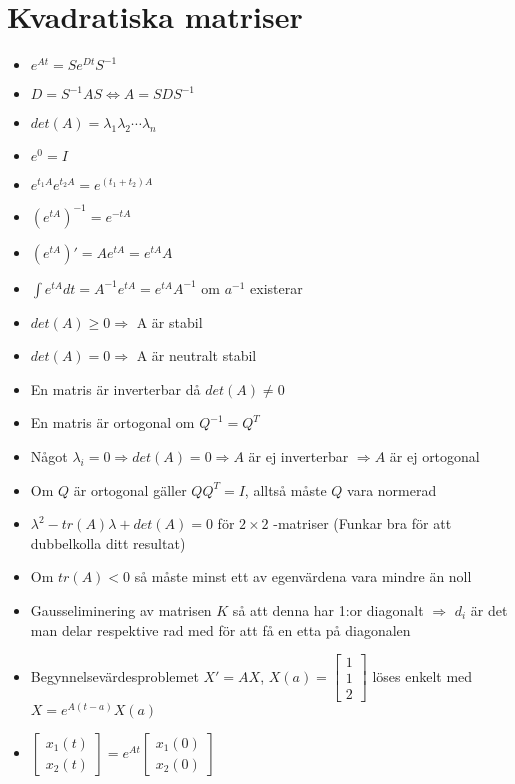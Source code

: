 \documentclass[a4paper,11pt]{article}
\begin{document}
\section{Kvadratiska matriser}
\begin{itemize}
\item
  $e^{At}=Se^{Dt}S^{-1}$
\item 
  $D=S^{-1}AS \Leftrightarrow A=SDS^{-1}$
\item
  $det(A) = \lambda_1\lambda_2 \cdots \lambda_n$
\item
  $e^0 = I$
\item
  $e^{t_1 A}e^{t_2 A} = e^{(t_1 + t_2) A}$
\item
  $(e^{tA})^{-1} = e^{-tA}$
\item
  $(e^{tA})' = Ae^{tA} = e^{tA}A$
\item
  $\displaystyle\int e^{tA}dt = A^{-1}e^{tA} = e^{tA}A^{-1}$ om $a^{-1}$ existerar
\item
  $det(A) \geq 0 \Rightarrow$ A är stabil
\item
  $det(A) = 0 \Rightarrow$ A är neutralt stabil
\item
  En matris är inverterbar då $det(A) \ne 0$
\item
  En matris är ortogonal om $Q^{-1} = Q^T$
\item
  Något $\lambda_i=0 \Rightarrow det(A)=0 \Rightarrow A$ är ej inverterbar $\Rightarrow A$ är ej ortogonal
\item
  Om $Q$ är ortogonal gäller $QQ^T = I$, alltså måste $Q$ vara normerad
\item
  $\lambda^2 - tr(A)\lambda  + det(A) = 0$ för $2\times 2$ -matriser (Funkar bra för att dubbelkolla ditt resultat)
\item
  Om $tr(A)<0$ så måste minst ett av egenvärdena vara mindre än noll
\item
  Gausseliminering av matrisen $K$ så att denna har 1:or diagonalt $\Rightarrow$ $d_i$ är det man delar respektive rad med för att få en etta på diagonalen
\item
  Begynnelsevärdesproblemet $X'=AX$, $ X(a)=
  \begin{bmatrix}
    1 \\
    1 \\
    2
  \end{bmatrix}$
  löses enkelt med $X=e^{A(t-a)}X(a)$
\item
  $\begin{bmatrix}
    x_1(t) \\
    x_2(t)
  \end{bmatrix}
  = e^{At} \begin{bmatrix}
    x_1(0) \\
    x_2(0)
  \end{bmatrix} $
\end{itemize}
\end{document}
